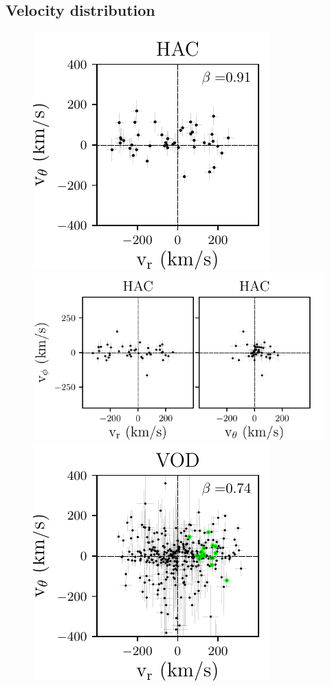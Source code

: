 \documentclass[fleqn,usenatbib]{mnras}
\begin{document}
\subsection{Velocity distribution}
%
\begin{figure}
	\includegraphics[scale=0.545]{HAC_velocities_vphi.pdf}
	\hspace{-0.25cm}
    \includegraphics[scale=0.545]{HAC_velocities_vtheta.pdf} \\
  \includegraphics[scale=0.545]{VOD_velocities_vphi.pdf}

\end{figure}
\end{document}
